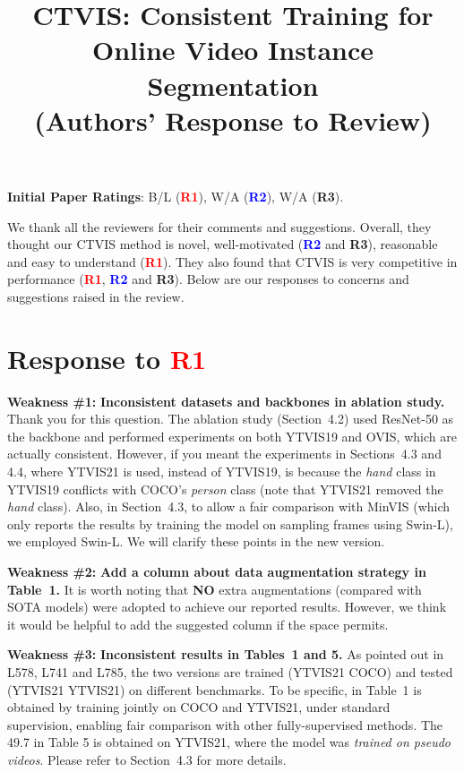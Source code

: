 \documentclass[10pt,twocolumn,letterpaper]{article}
\newcommand{\R}[1]{{\textbf{\ifstrequal{#1}{1}{\textcolor{red}{R#1}}{\ifstrequal{#1}{2}{\textcolor{blue}{R#1}}{\ifstrequal{#1}{3}{\textcolor{green!70!black}{R#1}}{\ifstrequal{#1}{4}{\textcolor{teal}{R#1}}{\textcolor{cyan}{R#1}}}}}}}}
\begin{document}
\title{CTVIS: Consistent Training for Online Video Instance Segmentation\\
\big(Authors' Response to Review\big)}
\maketitle
\thispagestyle{empty}
\appendix


\noindent\textbf{Initial Paper Ratings}: B/L (\R1), W/A (\R2), W/A (\R3).



We thank all the reviewers for their comments and suggestions. Overall, they thought our CTVIS method is novel, well-motivated (\R2 and \R3), reasonable and easy to understand (\R1). They also found that CTVIS is very competitive in performance (\R1, \R2 and \R3). 
Below are our responses to concerns and suggestions raised in the review.

\section{Response to \R1}

\noindent\textbf{Weakness \#1:} \textbf{Inconsistent datasets and backbones in ablation study.} 
Thank you for this question. The ablation study (\ie Section~4.2) used ResNet-50 as the backbone and performed experiments on both YTVIS19 and OVIS, which are actually consistent. 
However, if you meant the experiments in Sections~4.3 and 4.4, where YTVIS21 is used, instead of YTVIS19, is because the \emph{hand} class in YTVIS19 conflicts with COCO's \emph{person} class (note that YTVIS21 removed the \emph{hand} class). 
Also, in Section~{4.3}, to allow a fair comparison with MinVIS (which only reports the results 
by training the model on
sampling frames using Swin-L), we employed Swin-L.  We will clarify these points in the new version. 

\noindent\textbf{Weakness \#2:} \textbf{Add a column about data augmentation strategy in Table~1.}
It is worth noting that \textbf{NO} extra augmentations (compared with SOTA models) were adopted to achieve our reported results. However, we think it would be helpful to add the suggested column if the space permits.

\noindent\textbf{Weakness \#3:} \textbf{Inconsistent results in Tables~1 and 5.}
As pointed out in L578, L741 and L785, the two versions are trained (YTVIS21 \vs COCO) and tested (YTVIS21 \vs YTVIS21) on different benchmarks. To be specific,  in Table~1 is obtained by training jointly on COCO and YTVIS21, under standard supervision, enabling fair comparison with other fully-supervised methods. The 49.7 in Table 5 is obtained on YTVIS21,  
where the model was \emph{trained on pseudo videos}. Please refer to Section~4.3 for more details. 
\end{document}
